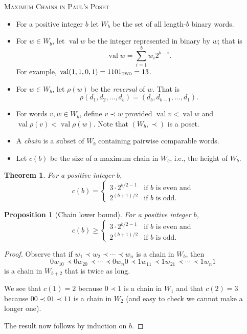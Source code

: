 \documentclass[12pt]{article}
\DeclareMathOperator{\val}{val}
\newtheorem{prop}[conj]{Proposition}
\newtheorem{thm}[conj]{Theorem}
\begin{document}
\begin{center}
  \textsc{\large Maximum Chains in Paul's Poset }
\end{center}

\begin{itemize}
\item For a positive integer $b$ let $W_b$ be the set of all
  length-$b$ binary words.

\item For $w \in W_b$, let $\val w$ be the integer represented in
  binary by $w$; that is
  \[
  \val w = \sum_{i=1}^b w_i 2^{b-i} .
  \]
  For example, $\val (1,1,0,1) = 1101_{\textsc{two}} = 13$.

\item For $w \in W_b$, let $\rho(w)$ be the \emph{reversal} of
  $w$. That is $$\rho(d_1,d_2,\ldots,d_b) =
  (d_b,d_{b-1},\ldots,d_1).$$

\item For words $v,w\in W_b$, define $v \prec w$ provided $\val v <
  \val w$ and $\val \rho(v) < \val \rho(w)$. Note that $(W_b,\prec)$
  is a poset.

\item A \emph{chain} is a subset of $W_b$ containing pairwise
  comparable words.



\item Let $c(b)$ be the size of a maximum chain in $W_b$, i.e., the
  height of $W_b$.

\end{itemize}

\begin{thm}\label{thm:main}
  For a positive integer $b$,
  \[
  c(b) = 
  \begin{cases}
    3\cdot 2^{b/2-1} & \text{if $b$ is even and} \\
    2^{(b+1)/2} & \text{if $b$ is odd}.
  \end{cases}
  \]
\end{thm}



\begin{prop}[Chain lower bound]\label{prop:c-lower}
    For a positive integer $b$,
  \[
  c(b) \ge
  \begin{cases}
    3\cdot 2^{b/2-1} & \text{if $b$ is even and} \\
    2^{(b+1)/2} & \text{if $b$ is odd}.
  \end{cases}
  \]
\end{prop}

\begin{proof}
  Observe that if $w_1\prec w_2 \prec \cdots \prec w_n$ is a chain in $W_b$, then 
  $$
  0w_10 \prec 0w_20 \prec \cdots \prec 0w_n0 \prec 1w_11\prec
  1w_21\prec \cdots \prec 1w_n1
  $$ is a chain
  in $W_{b+2}$ that is twice as long.

  We see that $c(1)=2$ because $0\prec1$ is a chain in $W_1$ and that
  $c(2)=3$ because $00\prec01\prec11$ is a chain in $W_2$ (and easy to
  check we cannot make a longer one).

  The result now follows by induction on $b$. 
\end{proof}
\end{document}

